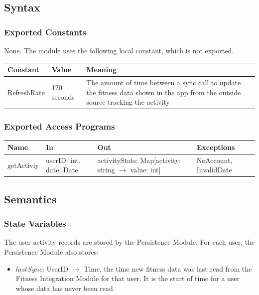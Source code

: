 \documentclass[12pt, titlepage]{article}
\begin{document}
\subsection{Syntax}

\subsubsection{Exported Constants}
None. The module uses the following local constant, which is not exported.\\

\begin{center}
\renewcommand{\arraystretch}{1.2}
\begin{tabular}{l l >{\raggedright\arraybackslash}p{7cm}}
\toprule
\textbf{Constant} & \textbf{Value} & \textbf{Meaning}\\
\midrule
\textsf{RefreshRate} & 120 seconds & The amount of time between a sync call to update the fitness data shown in the app from the outside source tracking the activity \\
\bottomrule
\end{tabular}
\end{center}

\subsubsection{Exported Access Programs}
\begin{center}
\small
\renewcommand{\arraystretch}{1.2}
\begin{tabularx}{\textwidth}{
  >{\raggedright\arraybackslash}p{3cm}
  >{\raggedright\arraybackslash}X
  >{\raggedright\arraybackslash}p{4.6cm}
  >{\raggedright\arraybackslash}p{3.8cm}}
\hline
\textbf{Name} & \textbf{In} & \textbf{Out} & \textbf{Exceptions} \\
\hline
getActiviy & userID: int, date: Date & activityStats: Map[activity: string $\longrightarrow$ value: int] & NoAccount, InvalidDate\\
\hline
\end{tabularx}
\end{center}

\subsection{Semantics}

\subsubsection{State Variables}
The user activity records are stored by the Persistence Module. For each user, the Persistence Module also stores:
\begin{itemize}
    \item $\mathit{lastSync}$: UserID $\longrightarrow$ Time, the time new fitness data was last read from the Fitness Integration Module for that user. It is the start of time for a user whose data has never been read.
\end{itemize}
\end{document}
